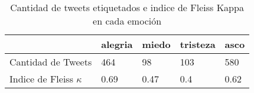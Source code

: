 \begin{table}[t]
\centering
\begin{tabular}{lllll}
\toprule
 & alegria & miedo & tristeza & asco \\
\midrule
Cantidad de Tweets & 464 & 98 & 103 & 580 \\
Indice de Fleiss $\kappa$ & 0.69 & 0.47 & 0.4 & 0.62 \\
\bottomrule
\end{tabular}
\caption{Cantidad de tweets etiquetados e indice de Fleiss Kappa en cada emoción}
\label{table:agreements}
\end{table}
